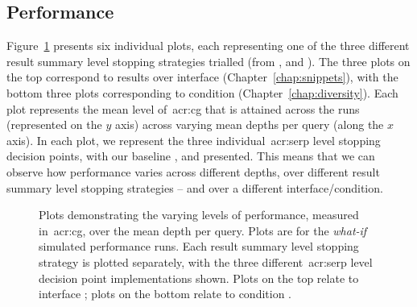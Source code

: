 \subsection{Performance}\label{sec:serp:results:perf}
Figure~\ref{fig:ch9_perf_plots} presents six individual plots, each representing one of the three different result summary level stopping strategies trialled (from ,  and ). The three plots on the top correspond to results over interface  (Chapter~\ref{chap:snippets}), with the bottom three plots corresponding to condition  (Chapter~\ref{chap:diversity}). Each plot represents the mean level of~\gls{acr:cg} that is attained across the runs (represented on the $y$ axis) across varying mean depths per query (along the $x$ axis). In each plot, we represent the three individual~\gls{acr:serp} level stopping decision points, with our baseline ,  and  presented. This means that we can observe how performance varies across different depths, over different result summary level stopping strategies -- and over a different interface/condition.

\begin{figure}[t!]
    \centering
    \caption[Stopping strategies and~\gls{acr:serp} decision point \emph{what-if} performance]{Plots demonstrating the varying levels of performance, measured in~\gls{acr:cg}, over the mean depth per query. Plots are for the \emph{what-if} simulated performance runs. Each result summary level stopping strategy is plotted separately, with the three different~\gls{acr:serp} level decision point implementations shown. Plots on the top relate to interface ; plots on the bottom relate to condition .}
    \label{fig:ch9_perf_plots}
\end{figure}

